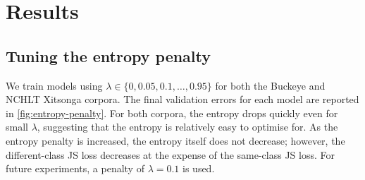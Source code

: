 \section{Results}
\label{sec:results}

\subsection{Tuning the entropy penalty}
We train models using $\lambda \in \{0, 0.05, 0.1, \dots, 0.95\}$ for both the Buckeye and NCHLT Xitsonga corpora.
The final validation errors for each model are reported in \cref{fig:entropy-penalty}.
For both corpora, the entropy drops quickly even for small $\lambda$, suggesting that the entropy is relatively easy to optimise for.
As the entropy penalty is increased, the entropy itself does not decrease; however, the different-class JS loss decreases at the expense of the same-class JS loss. 
For future experiments, a penalty of $\lambda = 0.1$ is used.

\begin{figure*}
  \centering

\caption{\label{fig:entropy-penalty} Effect of varying the entropy penalty for the English (left) and Xitsonga (right) corpora.
The average entropy of the output distribution over the validation samples is shown along with the (root) Jensen-Shannon loss: Both the combined JS loss that is optimised for, and separately for same-class and different-class frame pairs.}
\end{figure*}

